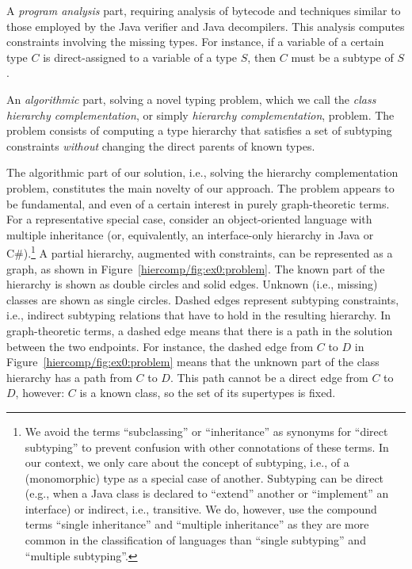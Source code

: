 \begin{asparaitem}[$\cdot$]
\item A \emph{program analysis} part, requiring analysis of bytecode
  and techniques similar to those employed by the Java verifier and
  Java decompilers. This analysis computes constraints involving the
  missing types. For instance, if a variable of a certain type $C$ is
  direct-assigned to a variable of a type $S$, then $C$ must be a
  subtype of $S$.
\item An \emph{algorithmic} part, solving a novel typing problem, which we call
  the \emph{class hierarchy complementation}, or
  simply \emph{hierarchy complementation}, problem. The problem
  consists of computing a type hierarchy that satisfies a set of
  subtyping constraints \emph{without} changing the direct parents of
  known types.
\end{asparaitem}



The algorithmic part of our solution, i.e., solving the hierarchy
complementation problem, constitutes the main novelty of our
approach. The problem appears to be fundamental, and even of a certain
interest in purely graph-theoretic terms. For a representative special
case, consider an object-oriented language with multiple inheritance
(or, equivalently, an interface-only hierarchy in Java or
C\#).\footnote{We avoid the terms ``subclassing'' or ``inheritance''
  as synonyms for ``direct subtyping'' to prevent confusion with other
  connotations of these terms. In our context, we only care about the
  concept of subtyping, i.e., of a (monomorphic) type as a special
  case of another. Subtyping can be direct (e.g., when a Java class is
  declared to ``extend'' another or ``implement'' an interface) or
  indirect, i.e., transitive. We do, however, use the compound terms
  ``single inheritance'' and ``multiple inheritance'' as they are more
  common in the classification of languages than ``single subtyping''
  and ``multiple subtyping''.}  A partial hierarchy, augmented with
constraints, can be represented as a graph, as shown in
Figure~\ref{hiercomp/fig:ex0:problem}. The known part of the hierarchy is shown
as double circles and solid edges. Unknown (i.e., missing) classes are
shown as single circles. Dashed edges represent subtyping constraints,
i.e., indirect subtyping relations that have to hold in the resulting
hierarchy. In graph-theoretic terms, a dashed edge means that there is
a path in the solution between the two endpoints. For instance, the
dashed edge from $C$ to $D$ in Figure~\ref{hiercomp/fig:ex0:problem} means that
the unknown part of the class hierarchy has a path from $C$ to
$D$. This path cannot be a direct edge from $C$ to $D$, however: $C$
is a known class, so the set of its supertypes is fixed.

